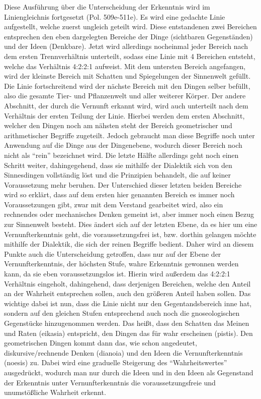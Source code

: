 Diese Ausführung über die Unterscheidung der Erkenntnis wird im Liniengleichnis fortgesetzt (Pol. 509e-511e).
Es wird eine gedachte Linie aufgestellt, welche zuerst ungleich geteilt wird. Diese entstandenen zwei Bereichen entsprechen den  eben dargelegten Bereiche der Dinge (sichtbaren Gegenständen) und der Ideen (Denkbare). Jetzt wird allerdings nocheinmal jeder Bereich nach dem ersten Trennverhältnis unterteilt, sodass eine Linie mit 4 Bereichen entsteht, welche das Verhältnis 4:2:2:1 aufweist. Mit dem untersten Bereich angefangen, wird der kleinste Bereich mit Schatten und Spiegelungen der Sinnenwelt gefüllt. Die Linie fortschreitend wird der nächste Bereich mit den Dingen selber befüllt, also die gesamte Tier- und Pflanzenwelt und aller weiterer Körper. Der andere Abschnitt, der durch die Vernunft erkannt wird, wird auch unterteilt nach dem Verhältnis der ersten Teilung der Linie. Hierbei werden dem ersten Abschnitt, welcher den Dingen noch am nähsten steht der Bereich geometrischer und arithmetischer Begriffe zugeteilt. Jedoch gebraucht man diese Begriffe noch unter Anwendung auf die Dinge aus der Dingenebene, wodurch dieser Bereich noch nicht als \enquote{rein} bezeichnet wird. Die letzte Hälfte allerdings geht noch einen Schritt weiter, dahingegehend, dass sie mithilfe der Dialektik sich von den Sinnesdingen vollständig löst und die Prinzipien behandelt, die auf keiner Voraussetzung mehr beruhen. Der Unterschied dieser letzten beiden Bereiche wird so erklärt, dass auf dem ersten hier genannten Bereich es immer noch Voraussetzungen gibt, zwar mit dem Verstand gearbeitet wird, also ein rechnendes oder mechanisches Denken gemeint ist, aber immer noch einen Bezug zur Sinnenwelt besteht. Dies ändert sich auf der letzten Ebene, da es hier um eine Vernunfterkenntnis geht, die voraussetzungsfrei ist, bzw. dorthin gelangen möchte mithilfe der Dialektik, die sich der reinen Begriffe bedient. 
Daher wird an diesem Punkte auch die Unterscheidung getroffen, dass nur auf der Ebene der Vernunfterkenntnis, der höchsten Stufe, wahre Erkenntnis gewonnen werden kann, da sie eben voraussetzungslos ist. Hierin wird außerdem das 4:2:2:1 Verhältnis eingeholt, dahingehend, dass derjenigen Bereichen, welche den Anteil an der Wahrheit entsprechen sollen, auch den größeren Anteil haben sollen.
Das wichtige dabei ist nun, dass die Linie nicht nur den Gegentandsbereich inne hat, sondern auf den gleichen Stufen entsprechend auch noch die gnoseologischen Gegenstücke hinzugenommen werden. Das heißt, dass den Schatten das Meinen und Raten (eikasia) entspricht, den Dingen das für wahr erscheinen (pistis). Den geometrischen Dingen kommt dann das, wie schon angedeutet, diskursive/rechnende Denken (dianoia) und den Ideen die Vernunfterkenntnis (noesis) zu. Dabei wird eine graduelle Steigerung des \enquote{Wahrheitswertes} ausgedrückt, wodurch man nur durch die Ideen und in den Ideen als Gegenstand der Erkenntnis unter Vernunfterkenntnis die voraussetzungsfreie und unumstößliche Wahrheit erkennt. 
